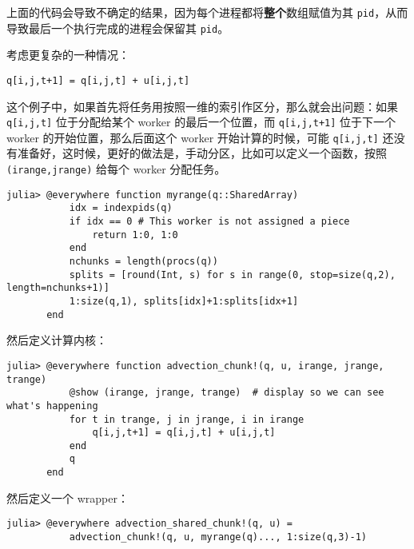 上面的代码会导致不确定的结果，因为每个进程都将\textbf{整个}数组赋值为其 \texttt{pid}，从而导致最后一个执行完成的进程会保留其 \texttt{pid}。



考虑更复杂的一种情况：




\begin{verbatim}
q[i,j,t+1] = q[i,j,t] + u[i,j,t]
\end{verbatim}



这个例子中，如果首先将任务用按照一维的索引作区分，那么就会出问题：如果 \texttt{q[i,j,t]} 位于分配给某个 worker 的最后一个位置，而 \texttt{q[i,j,t+1]} 位于下一个 worker 的开始位置，那么后面这个 worker 开始计算的时候，可能 \texttt{q[i,j,t]} 还没有准备好，这时候，更好的做法是，手动分区，比如可以定义一个函数，按照 \texttt{(irange,jrange)} 给每个 worker 分配任务。




\begin{verbatim}
julia> @everywhere function myrange(q::SharedArray)
           idx = indexpids(q)
           if idx == 0 # This worker is not assigned a piece
               return 1:0, 1:0
           end
           nchunks = length(procs(q))
           splits = [round(Int, s) for s in range(0, stop=size(q,2), length=nchunks+1)]
           1:size(q,1), splits[idx]+1:splits[idx+1]
       end
\end{verbatim}



然后定义计算内核：




\begin{verbatim}
julia> @everywhere function advection_chunk!(q, u, irange, jrange, trange)
           @show (irange, jrange, trange)  # display so we can see what's happening
           for t in trange, j in jrange, i in irange
               q[i,j,t+1] = q[i,j,t] + u[i,j,t]
           end
           q
       end
\end{verbatim}



然后定义一个 wrapper：




\begin{verbatim}
julia> @everywhere advection_shared_chunk!(q, u) =
           advection_chunk!(q, u, myrange(q)..., 1:size(q,3)-1)
\end{verbatim}



